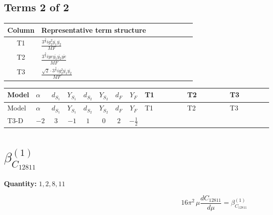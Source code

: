 \documentclass[8pt]{article}
\begin{document}
\begin{landscape}
\subsection*{Terms 2 of 2}
\begin{center}
\begin{tabular}{@{}c >{\raggedright\arraybackslash}p{0.82\linewidth}@{}}
\toprule
Column & Representative term structure \\
\midrule
T1 & \(\displaystyle \frac{3^{\frac{3}{4}} i g_{2}^{2} \overline{y_{1}} \overline{y_{2}}}{MF}\) \\
\midrule
T2 & \(\displaystyle \frac{3^{\frac{3}{4}} i ye \overline{y_{1}} \overline{y_{2}} \overline{ye}}{MF}\) \\
\midrule
T3 & \(\displaystyle \frac{\sqrt{2} \cdot 3^{\frac{3}{4}} i g_{2}^{2} \overline{y_{1}} \overline{y_{2}}}{MF}\) \\
\midrule
\bottomrule
\end{tabular}
\end{center}
\smallskip
\tiny
\begin{longtable}{@{}llcccccc >{\raggedright\arraybackslash}p{0.21\linewidth} >{\raggedright\arraybackslash}p{0.21\linewidth} >{\raggedright\arraybackslash}p{0.21\linewidth}@{}}
\toprule
Model & $\alpha$ & $d_{S_1}$ & $Y_{S_1}$ & $d_{S_2}$ & $Y_{S_2}$ & $d_F$ & $Y_F$ & T1 & T2 & T3 \\
\midrule
\endfirsthead
\toprule
Model & $\alpha$ & $d_{S_1}$ & $Y_{S_1}$ & $d_{S_2}$ & $Y_{S_2}$ & $d_F$ & $Y_F$ & T1 & T2 & T3 \\
\midrule
\endhead
T3-D & $-2$ & $3$ & $-1$ & $1$ & $0$ & $2$ & $-\frac{1}{2}$ & \scriptsize\adjustbox{max width=\linewidth}{$\begin{gathered} \frac{25 \cdot 3^{\frac{3}{4}} i g_{2}^{2} \overline{y_{1}} \overline{y_{2}}}{24 MF}\end{gathered}$} & \scriptsize\adjustbox{max width=\linewidth}{$\begin{gathered} - \frac{3^{\frac{3}{4}} i ye \overline{y_{1}} \overline{y_{2}} \overline{ye}}{12 MF}\end{gathered}$} & \scriptsize\adjustbox{max width=\linewidth}{$\begin{gathered} \frac{\sqrt{2} \cdot 3^{\frac{3}{4}} i g_{2}^{2} \overline{y_{1}} \overline{y_{2}}}{6 MF}\end{gathered}$} \\
\midrule
\bottomrule
\end{longtable}
\clearpage
\section*{$\beta_{C_{12811}}^{(1)}$}
\noindent\textbf{Quantity: }$\mathrm{1,2,8,11}$\par\smallskip
\[16\pi^2\,\mu\frac{d C_{12811}}{d\mu}=\beta_{C_{12811}}^{(1)}\]

\end{landscape}
\end{document}
